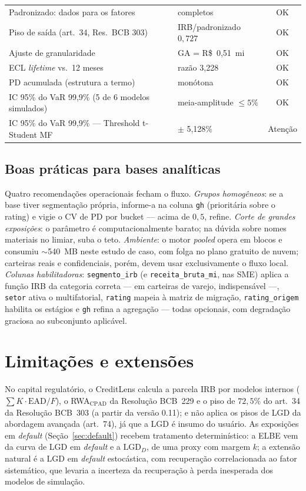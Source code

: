 \documentclass[11pt,a4paper]{article}
\begin{document}
\begin{table}[H]
\begin{tabular}{p{7.1cm}p{5.3cm}c}
Padronizado: dados para os fatores & completos & OK \\
Piso de saída (art.~34, Res.\ BCB 303) & IRB/padronizado $0{,}727$ & OK \\
Ajuste de granularidade & GA = R\$~0,51~mi & OK \\
ECL \emph{lifetime} vs.\ 12 meses & razão 3,228 & OK \\
PD acumulada (estrutura a termo) & monótona & OK \\
IC 95\% do VaR 99{,}9\% (5 de 6 modelos simulados) & meia-amplitude $\le 5\%$ & OK \\
IC 95\% do VaR 99{,}9\% --- Threshold t-Student MF & $\pm$ 5,128\% & Atenção \\
\bottomrule
\end{tabular}
\end{table}

\subsection{Boas práticas para bases analíticas}

Quatro recomendações operacionais fecham o fluxo. \emph{Grupos homogêneos}: se a base tiver segmentação própria, informe-a na coluna \texttt{gh} (prioritária sobre o rating) e vigie o CV de PD por bucket --- acima de $0{,}5$, refine. \emph{Corte de grandes exposições}: o parâmetro é computacionalmente barato; na dúvida sobre nomes materiais no limiar, suba o teto. \emph{Ambiente}: o motor \emph{pooled} opera em blocos e consumiu $\sim$540~MB neste estudo de caso, com folga no plano gratuito de nuvem; carteiras reais e confidenciais, porém, devem usar exclusivamente o fluxo local. \emph{Colunas habilitadoras}: \texttt{segmento\_irb} (e \texttt{receita\_bruta\_mi}, nas SME) aplica a função IRB da categoria correta --- em carteiras de varejo, indispensável ---, \texttt{setor} ativa o multifatorial, \texttt{rating} mapeia à matriz de migração, \texttt{rating\_origem} habilita os estágios e \texttt{gh} refina a agregação --- todas opcionais, com degradação graciosa ao subconjunto aplicável.

\section{Limitações e extensões}

No capital regulatório, o CreditLens calcula a parcela IRB por modelos internos ($\sum K\cdot\mathrm{EAD}/F$), o RWA$_{\mathrm{CPAD}}$ da Resolução BCB~229 e o piso de $72{,}5\%$ do art.~34 da Resolução BCB~303 (a partir da versão 0.11); e não aplica os pisos de LGD da abordagem avançada (art.~74), já que a LGD é insumo do usuário. As exposições em \emph{default} (Seção~\ref{sec:default}) recebem tratamento determinístico: a ELBE vem da curva de LGD em \emph{default} e a $\mathrm{LGD}_D$, de uma proxy com margem $k$; a extensão natural é a LGD em \emph{default} estocástica, com recuperação correlacionada ao fator sistemático, que levaria a incerteza da recuperação à perda inesperada dos modelos de simulação.
\end{document}

